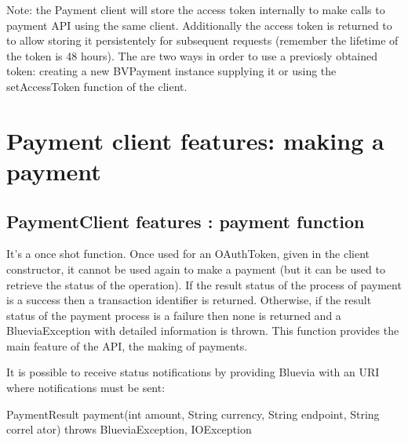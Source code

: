 Note: the Payment client will store the access token internally to make calls to payment API using the same client. Additionally the access token is returned to to allow storing it persistentely for subsequent requests (remember the lifetime of the token is 48 hours). The are two ways in order to use a previosly obtained token: creating a new BVPayment instance supplying it or using the setAccessToken function of the client.\hypertarget{blv_payment_guide_paymentclient_features_funcitions}{}\section{Payment client features: making a payment}\label{blv_payment_guide_paymentclient_features_funcitions}
\hypertarget{blv_payment_guide_paymentclient_features_payment_function}{}\subsection{PaymentClient features : payment function}\label{blv_payment_guide_paymentclient_features_payment_function}
It's a once shot function. Once used for an OAuthToken, given in the client constructor, it cannot be used again to make a payment (but it can be used to retrieve the status of the operation). If the result status of the process of payment is a success then a transaction identifier is returned. Otherwise, if the result status of the payment process is a failure then none is returned and a BlueviaException with detailed information is thrown. This function provides the main feature of the API, the making of payments.

It is possible to receive status notifications by providing Bluevia with an URI where notifications must be sent:


\begin{DoxyCode}
PaymentResult payment(int amount, String currency, String endpoint, String correl
      ator) throws BlueviaException, IOException
\end{DoxyCode}


